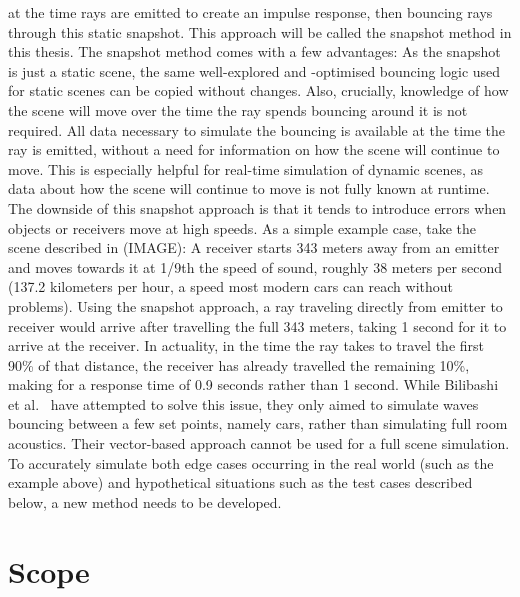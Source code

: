 at the time rays are emitted to create an impulse response,
then bouncing rays through this static snapshot.
This approach will be called the snapshot method in this thesis.
\newline
The snapshot method comes with a few advantages:
As the snapshot is just a static scene,
the same well-explored and -optimised bouncing logic used for static scenes can be copied without changes.
Also, crucially, knowledge of how the scene will move over the time the ray spends bouncing around it is not required.
All data necessary to simulate the bouncing is available at the time the ray is emitted,
without a need for information on how the scene will continue to move.
This is especially helpful for real-time simulation of dynamic scenes, as data about how the scene will continue to move is not
fully known at runtime.
\newline
The downside of this snapshot approach is that it tends to introduce errors when objects or receivers move at high speeds.
As a simple example case, take the scene described in (IMAGE):
A receiver starts 343 meters away from an emitter and moves towards it at 1/9th the speed of sound, roughly 38 meters per second
(137.2 kilometers per hour, a speed most modern cars can reach without problems).
Using the snapshot approach, a ray traveling directly from emitter to receiver would arrive after travelling the full 343 meters,
taking 1 second for it to arrive at the receiver.
In actuality, in the time the ray takes to travel the first 90\% of that distance,
the receiver has already travelled the remaining 10\%, making for a response time of 0.9 seconds rather than 1 second.
\newline
While Bilibashi et al.~\cite{BVD20} have attempted to solve this issue,
they only aimed to simulate waves bouncing between a few set points, namely cars,
rather than simulating full room acoustics.
Their vector-based approach cannot be used for a full scene simulation.
\newline
To accurately simulate both edge cases occurring in the real world (such as the example above)
and hypothetical situations such as the test cases described below,
a new method needs to be developed.

\section{Scope}

